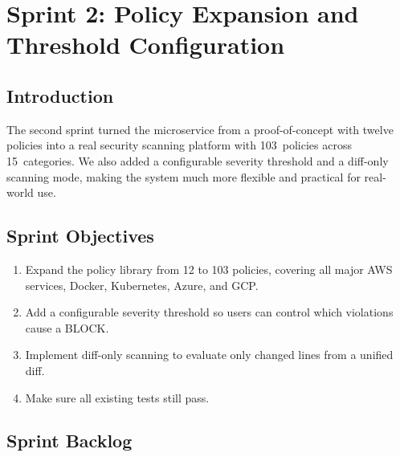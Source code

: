 
\chapter{Sprint 2: Policy Expansion and Threshold Configuration}
\label{chap:sprint2}

\section{Introduction}

The second sprint turned the microservice from a proof-of-concept with twelve policies into a real security scanning platform with 103~policies across 15~categories. We also added a configurable severity threshold and a diff-only scanning mode, making the system much more flexible and practical for real-world use.


\section{Sprint Objectives}

\begin{enumerate}[leftmargin=1.5cm]
  \item Expand the policy library from 12 to 103 policies, covering all major AWS services, Docker, Kubernetes, Azure, and GCP.
  \item Add a configurable severity threshold so users can control which violations cause a BLOCK.
  \item Implement diff-only scanning to evaluate only changed lines from a unified diff.
  \item Make sure all existing tests still pass.
\end{enumerate}


\section{Sprint Backlog}

